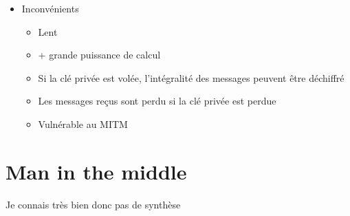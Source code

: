 \documentclass[a4paper]{article}
\begin{document}
\begin{itemize}[label=\textbullet, font=\Large]
\begin{itemize}[label=, font=\scriptsize]
\begin{itemize}
        \end{itemize}
        \item Inconvénients
        \begin{itemize}
            \item Lent
            \item + grande puissance de calcul
            \item Si la clé privée est volée, l'intégralité des messages peuvent être déchiffré
            \item Les messages reçus sont perdu si la clé privée est perdue
            \item Vulnérable au MITM
        \end{itemize}
    \end{itemize}
\end{itemize}

\section{Man in the middle}
Je connais très bien donc pas de synthèse
\end{document}
